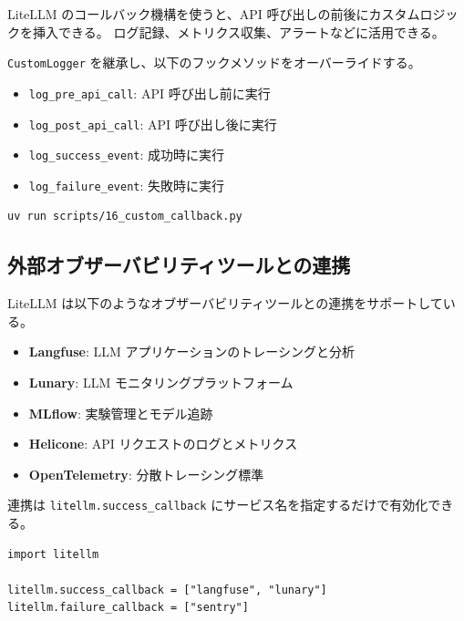 \documentclass[a4paper,11pt]{ltjsarticle}
\newcommand{\code}[1]{\texttt{#1}}
\begin{document}
LiteLLM のコールバック機構を使うと、API 呼び出しの前後にカスタムロジックを挿入できる。
ログ記録、メトリクス収集、アラートなどに活用できる。



\code{CustomLogger} を継承し、以下のフックメソッドをオーバーライドする。

\begin{itemize}
  \item \code{log\_pre\_api\_call}: API 呼び出し前に実行
  \item \code{log\_post\_api\_call}: API 呼び出し後に実行
  \item \code{log\_success\_event}: 成功時に実行
  \item \code{log\_failure\_event}: 失敗時に実行
\end{itemize}

\begin{lstlisting}[style=bash]
uv run scripts/16_custom_callback.py
\end{lstlisting}

\subsection{外部オブザーバビリティツールとの連携}

LiteLLM は以下のようなオブザーバビリティツールとの連携をサポートしている。

\begin{itemize}
  \item \textbf{Langfuse}: LLM アプリケーションのトレーシングと分析
  \item \textbf{Lunary}: LLM モニタリングプラットフォーム
  \item \textbf{MLflow}: 実験管理とモデル追跡
  \item \textbf{Helicone}: API リクエストのログとメトリクス
  \item \textbf{OpenTelemetry}: 分散トレーシング標準
\end{itemize}

連携は \code{litellm.success\_callback} にサービス名を指定するだけで有効化できる。

\begin{lstlisting}[style=python, caption={外部ツールとの連携（設定例）}]
import litellm

litellm.success_callback = ["langfuse", "lunary"]
litellm.failure_callback = ["sentry"]
\end{lstlisting}
\end{document}
